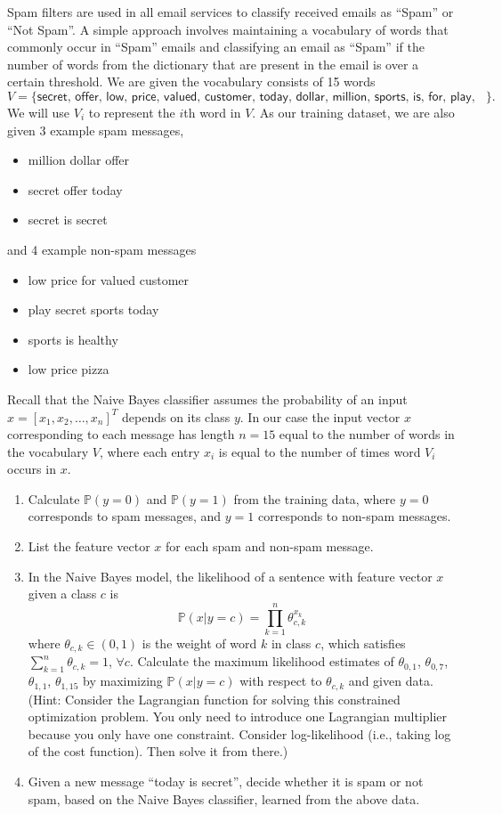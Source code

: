 \documentclass[twoside,10pt]{article}
\begin{document}
\begin{enumerate}
Spam filters are used in all email services to classify received emails as ``Spam'' or ``Not Spam''. A simple approach involves maintaining a vocabulary of words that commonly occur in ``Spam'' emails and classifying an email as ``Spam'' if the number of words from the dictionary that are present in the email is over a certain threshold.
We are given the vocabulary consists of 15 words \[V=\{\textsf{secret, offer, low, price, valued, customer, today, dollar, million, sports, is, for, play, healthy, pizza}\}.\] We will use $V_i$ to represent the $i$th word in $V$. As our training dataset, we are also given 3 example spam messages,
\begin{itemize}
\item \textsf{million dollar offer}
\item \textsf{secret offer today}
\item \textsf{secret is secret}
\end{itemize}
and 4 example non-spam messages
\begin{itemize}
\item \textsf{low price for valued customer}
\item \textsf{play secret sports today}
\item \textsf{sports is healthy}
\item \textsf{low price pizza}
\end{itemize}

Recall that the Naive Bayes classifier assumes the probability of an input $x = [x_1, x_2, \ldots, x_n]^T$ depends on its class $y$. In our case the input vector $x$ corresponding to each message has length $n = 15$ equal to the number of words in the vocabulary $V$, where each entry $x_i$ is equal to the number of times word $V_i$ occurs in $x$.

\begin{enumerate}
\item Calculate $\mathbb P(y = 0)$ and $\mathbb P(y = 1)$ from the training data, where $y = 0$ corresponds to spam messages, and $y = 1$ corresponds to non-spam messages.
\item List the feature vector $x$ for each spam and non-spam message.
\item In the Naive Bayes model, the likelihood of a sentence with feature vector $x$ given a class $c$ is
\[
\mathbb P (x|y = c) = \prod_{k=1}^n \theta_{c, k}^{x_k}
\]
where $\theta_{c,k} \in (0, 1)$ is the weight of word $k$ in class $c$, which satisfies $\sum_{k=1}^n \theta_{c, k} = 1$, $\forall c$. Calculate the maximum likelihood estimates of $\theta_{0,1}$, $\theta_{0,7}$, $\theta_{1,1}$, $\theta_{1,15}$ by maximizing $\mathbb P (x|y = c)$ with respect to $\theta_{c, k}$ and given data. (Hint: Consider the Lagrangian function for solving this constrained optimization problem. You only need to introduce one Lagrangian multiplier because you only have one constraint. Consider log-likelihood (i.e., taking log of the cost function). Then solve it from there.)
\item Given a new message ``\textsf{today is secret}'', decide whether it is spam or not spam, based on the Naive
Bayes classifier, learned from the above data.


\end{enumerate}
\end{enumerate}
\end{document}
